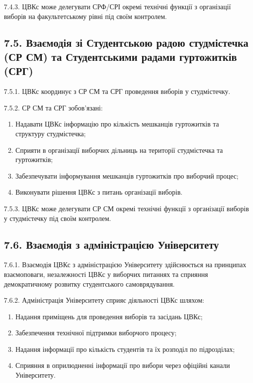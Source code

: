     7.4.3. ЦВКс може делегувати СРФ/СРІ окремі технічні функції з організації виборів на факультетському рівні під своїм контролем.

\subsection*{7.5. Взаємодія зі Студентською радою студмістечка (СР СМ) та Студентськими радами гуртожитків (СРГ)}
    7.5.1. ЦВКс координує з СР СМ та СРГ проведення виборів у студмістечку.

    7.5.2. СР СМ та СРГ зобов'язані:

        \begin{enumerate}[label=\alph*)]
            \item Надавати ЦВКс інформацію про кількість мешканців гуртожитків та структуру студмістечка;
            \item Сприяти в організації виборчих дільниць на території студмістечка та гуртожитків;
            \item Забезпечувати інформування мешканців гуртожитків про виборчий процес;
            \item Виконувати рішення ЦВКс з питань організації виборів.
        \end{enumerate}

    7.5.3. ЦВКс може делегувати СР СМ окремі технічні функції з організації виборів у студмістечку під своїм контролем.

\subsection*{7.6. Взаємодія з адміністрацією Університету}
    7.6.1. Взаємодія ЦВКс з адміністрацією Університету здійснюється на принципах взаємоповаги, незалежності ЦВКс у виборчих питаннях та сприяння демократичному розвитку студентського самоврядування.

    7.6.2. Адміністрація Університету сприяє діяльності ЦВКс шляхом:

        \begin{enumerate}[label=\alph*)]
            \item Надання приміщень для проведення виборів та засідань ЦВКс;
            \item Забезпечення технічної підтримки виборчого процесу;
            \item Надання інформації про кількість студентів та їх розподіл по підрозділах;
            \item Сприяння в оприлюдненні інформації про вибори через офіційні канали Університету.
        \end{enumerate}

